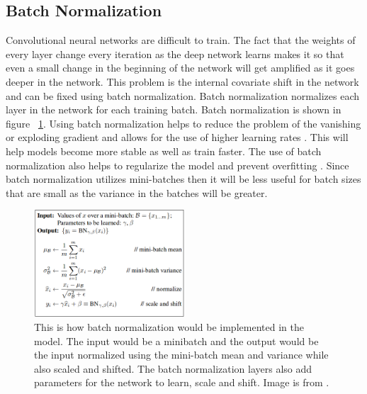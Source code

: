 \subsection{Batch Normalization}
    Convolutional neural networks are difficult to train. 
    The fact that the weights of every layer change every iteration as the deep network learns makes it so that even a small change in the beginning of the network will get amplified as it goes deeper in the network.
    This problem is the internal covariate shift in the network and can be fixed using batch normalization. 
    Batch normalization normalizes each layer in the network for each training batch. 
    Batch normalization is shown in figure ~\ref{fig_batch_norm}. 
    Using batch normalization helps to reduce the problem of the vanishing or exploding gradient and allows for the use of higher learning rates \cite{DBLP:journals/corr/IoffeS15}. 
    This will help models become more stable as well as train faster. 
    The use of batch normalization also helps to regularize the model and prevent overfitting \cite{DBLP:journals/corr/IoffeS15}. 
    Since batch normalization utilizes mini-batches then it will be less useful for batch sizes that are small as the variance in the batches will be greater.

\begin{figure}[tbh]
\centering
\includegraphics[width=0.5\textwidth]{batch_norm.png}
\caption{ This is how batch normalization would be implemented in the model. The input would be a minibatch and the output would be the input normalized using the mini-batch mean and variance while also scaled and shifted. The batch normalization layers also add parameters for the network to learn, scale and shift. Image is from \cite{DBLP:journals/corr/IoffeS15}. }
\label{fig_batch_norm}
\end{figure} 





